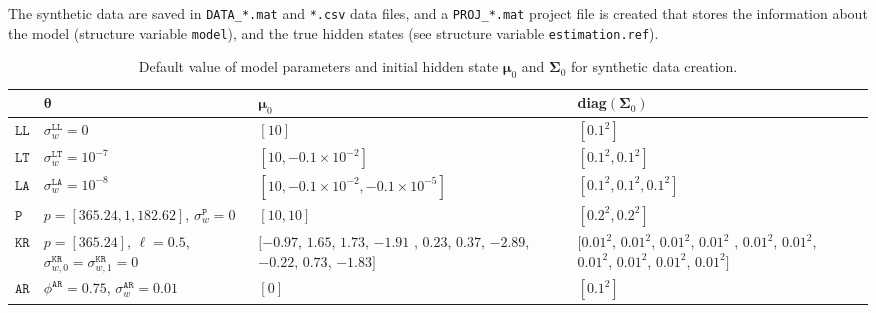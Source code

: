 The synthetic data are saved in \lstinline[basicstyle = \mlttfamily \small, backgroundcolor = \color{light-gray}]!DATA_*.mat! and \lstinline[basicstyle = \mlttfamily \small, backgroundcolor = \color{light-gray}]!*.csv! data files, and a \lstinline[basicstyle = \mlttfamily \small, backgroundcolor = \color{light-gray}]!PROJ_*.mat! project file is created that stores the information about the model (structure variable \lstinline[basicstyle = \mlttfamily \small, backgroundcolor = \color{light-gray}]!model!), and the true hidden states (see structure variable \lstinline[basicstyle = \mlttfamily \small, backgroundcolor = \color{light-gray}]!estimation.ref!).





\begin{table}[h]

     \begin{tabular}{|C{1cm}|C{3.25cm} |C{3.25cm}  |C{3.25cm} |N}\hline
        & $\bm{\theta}$ & $\bm{\mu}_{0}$ & diag$(\mathbf{\Sigma}_{0})$ &\\[25pt]\hline
    $\mathtt{LL}$   &  $\sigma_{w}^{\mathtt{LL}}=0$ &$[10]$ & $[0.1^{2}]$ &\\[25pt]\hline
    $\mathtt{LT}$    & $\sigma_{w}^{\mathtt{LT}}=10^{-7}$ &  $[10, -0.1\times10^{-2}]$ & $[0.1^{2}, 0.1^{2}]$ &\\[25pt]\hline
     $\mathtt{LA}$   & $\sigma_{w}^{\mathtt{LA}}=10^{-8}$  &  $[10, -0.1\times10^{-2} , -0.1\times10^{-5}]$ & $[0.1^{2}, 0.1^{2}, 0.1^{2}]$ &\\[25pt]\hline
     $\mathtt{P}$  &  $p=[365.24, 1, 182.62] $, $\sigma_{w}^{\mathtt{P}}=0$  &$[10, 10]$ & $[0.2^{2}, 0.2^{2}]$  &\\[25pt]\hline
     $\mathtt{KR}$  & $p=[365.24]$, $\ell=0.5$, $\sigma_{w,0}^{\mathtt{KR}}=\sigma_{w,1}^{\mathtt{KR}}=0$ &  $[$$-0.97$, $1.65$, $1.73$, $-1.91$ , $0.23$, $0.37$, $-2.89$, $-0.22$, $0.73$, $-1.83$$]$ & $[$$0.01^{2}$, $0.01^{2}$, $0.01^{2}$, $0.01^{2}$ , $0.01^{2}$, $0.01^{2}$, $0.01^{2}$, $0.01^{2}$, $0.01^{2}$, $0.01^{2}$$]$  &\\[25pt]\hline  
         $\mathtt{AR}$   &  $\phi^{\mathtt{AR}}=0.75$, $\sigma_{w}^{\mathtt{AR}}=0.01$  &$[0]$ & $[0.1^{2}]$ &\\[25pt]\hline
     \end{tabular}
     \caption{Default value of model parameters and initial hidden state $\bm{\mu}_{0}$ and $\mathbf{\Sigma}_{0}$ for synthetic data creation.} 
\label{table:defaultsynthetic}
\end{table}

